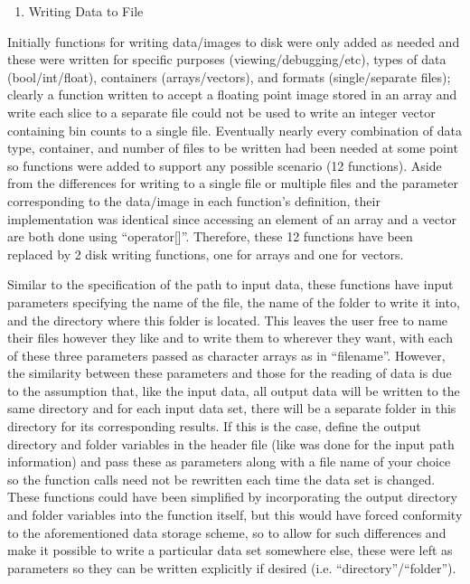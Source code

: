 \documentclass{article}
\begin{document}
\clearpage
\begin{enumerate}[label = (\arabic*), leftmargin = 0.0cm, resume = section]
\bfseries
\item Writing Data to File
\end{enumerate}
Initially functions for writing data/images to disk were only added as needed and these were written for specific purposes (viewing/debugging/etc), types of data (bool/int/float), containers (arrays/vectors), and formats (single/separate files); clearly a function written to accept a floating point image stored in an array and write each slice to a separate file could not be used to write an integer vector containing bin counts to a single file.  Eventually nearly every combination of data type, container, and number of files to be written had been needed at some point so functions were added to support any possible scenario (12 functions).  Aside from the differences for writing to a single file or multiple files and the parameter corresponding to the data/image in each function's definition, their implementation was identical since accessing an element of an array and a vector are both done using ``operator[]''.  Therefore, these 12 functions have been replaced by 2 disk writing functions, one for arrays and one for vectors.

Similar to the specification of the path to input data, these functions have input parameters specifying the name of the file, the name of the folder to write it into, and the directory where this folder is located.  This leaves the user free to name their files however they like and to write them to wherever they want, with each of these three parameters passed as character arrays as in ``filename''.  However, the similarity between these parameters and those for the reading of data is due to the assumption that, like the input data, all output data will be written to the same directory and for each input data set, there will be a separate folder in this directory for its corresponding results.  If this is the case, define the output directory and folder variables in the header file (like was done for the input path information) and pass these as parameters along with a file name of your choice so the function calls need not be rewritten each time the data set is changed.  These functions could have been simplified by incorporating the output directory and folder variables into the function itself, but this would have forced conformity to the aforementioned data storage scheme, so to allow for such differences and make it possible to write a particular data set somewhere else, these were left as parameters so they can be written explicitly if desired (i.e. ``directory''/``folder'').
\end{document}
